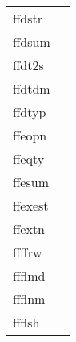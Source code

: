 \documentclass[11pt]{book}
\begin{document}
\begin{tabular}{lr}
ffdstr     & \pageref{ffdkey} \\
ffdsum  & \pageref{ffdsum} \\
ffdt2s  & \pageref{ffdt2s} \\
ffdtdm   & \pageref{ffdtdm} \\
ffdtyp    & \pageref{ffdtyp} \\
ffeopn    & \pageref{ffopen} \\
ffeqty    & \pageref{ffgtcl} \\
ffesum  & \pageref{ffesum} \\
ffexest  & \pageref{ffexist} \\
ffextn   & \pageref{ffextn} \\
ffffrw    & \pageref{ffffrw} \\
ffflmd      & \pageref{ffflmd} \\
ffflnm      & \pageref{ffflnm} \\
ffflsh     & \pageref{ffflus} \\
\end{tabular}
\end{document}
